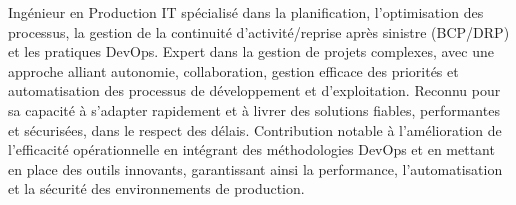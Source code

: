 \par{
Ingénieur en Production IT spécialisé dans la planification, l'optimisation des processus, la gestion de la continuité d'activité/reprise après sinistre (BCP/DRP) et les pratiques DevOps.
Expert dans la gestion de projets complexes, avec une approche alliant autonomie, collaboration, gestion efficace des priorités et automatisation des processus de développement et d'exploitation.
Reconnu pour sa capacité à s'adapter rapidement et à livrer des solutions fiables, performantes et sécurisées, dans le respect des délais.
Contribution notable à l'amélioration de l'efficacité opérationnelle en intégrant des méthodologies DevOps et en mettant en place des outils innovants, garantissant ainsi la performance, l'automatisation et la sécurité des environnements de production.
}